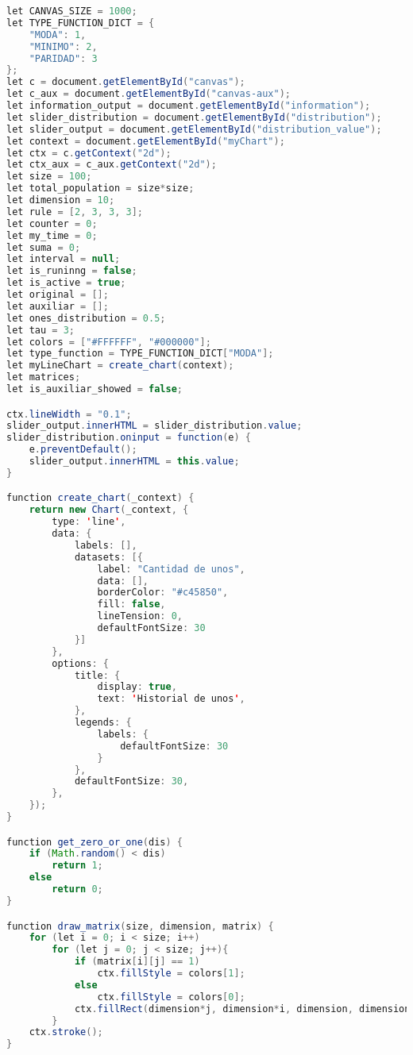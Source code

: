 \documentclass[a4paper,12pt]{article}
\begin{document}
\begin{lstlisting}[language=Java]
let CANVAS_SIZE = 1000;
let TYPE_FUNCTION_DICT = {
    "MODA": 1,
    "MINIMO": 2,
    "PARIDAD": 3
};
let c = document.getElementById("canvas");
let c_aux = document.getElementById("canvas-aux");
let information_output = document.getElementById("information");
let slider_distribution = document.getElementById("distribution");
let slider_output = document.getElementById("distribution_value");
let context = document.getElementById("myChart");
let ctx = c.getContext("2d");
let ctx_aux = c_aux.getContext("2d");
let size = 100;
let total_population = size*size;
let dimension = 10;
let rule = [2, 3, 3, 3];
let counter = 0;
let my_time = 0;
let suma = 0;
let interval = null;
let is_runinng = false;
let is_active = true;
let original = [];
let auxiliar = [];
let ones_distribution = 0.5;
let tau = 3;
let colors = ["#FFFFFF", "#000000"];
let type_function = TYPE_FUNCTION_DICT["MODA"];
let myLineChart = create_chart(context);
let matrices;
let is_auxiliar_showed = false;

ctx.lineWidth = "0.1";
slider_output.innerHTML = slider_distribution.value;
slider_distribution.oninput = function(e) {
    e.preventDefault();
    slider_output.innerHTML = this.value;
}

function create_chart(_context) {
    return new Chart(_context, {
        type: 'line',
        data: {
            labels: [],
            datasets: [{
                label: "Cantidad de unos",
                data: [],
                borderColor: "#c45850",
                fill: false,
                lineTension: 0,
                defaultFontSize: 30 
            }]
        },
        options: {
            title: {
                display: true,
                text: 'Historial de unos',
            },
            legends: {
                labels: {
                    defaultFontSize: 30
                }
            },
            defaultFontSize: 30,
        },
    });
}

function get_zero_or_one(dis) {
    if (Math.random() < dis)
        return 1;
    else
        return 0;
}

function draw_matrix(size, dimension, matrix) {
    for (let i = 0; i < size; i++)
        for (let j = 0; j < size; j++){
            if (matrix[i][j] == 1)
                ctx.fillStyle = colors[1];
            else
                ctx.fillStyle = colors[0];
            ctx.fillRect(dimension*j, dimension*i, dimension, dimension);
        }
    ctx.stroke();
}


\end{lstlisting}
\end{document}
